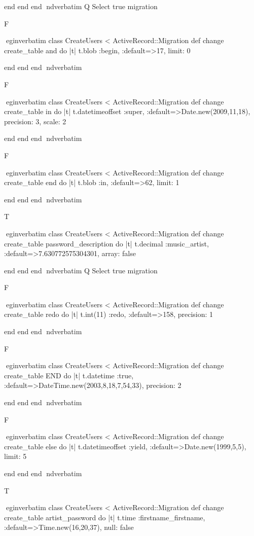     end 
  end 
end
nd{verbatim}
Q
 Select true migration

F

egin{verbatim}
 class CreateUsers < ActiveRecord::Migration 
  def change 
    create_table and do |t| 
      t.blob :begin, :default=>17, limit: 0
    
    end 
  end 
end
nd{verbatim}

F

egin{verbatim}
 class CreateUsers < ActiveRecord::Migration 
  def change 
    create_table in do |t| 
      t.datetimeoffset :super, :default=>Date.new(2009,11,18), precision: 3, scale: 2
    
    end 
  end 
end
nd{verbatim}

F

egin{verbatim}
 class CreateUsers < ActiveRecord::Migration 
  def change 
    create_table end do |t| 
      t.blob :in, :default=>62, limit: 1
    
    end 
  end 
end
nd{verbatim}

T

egin{verbatim}
 class CreateUsers < ActiveRecord::Migration 
  def change 
    create_table password_description do |t| 
      t.decimal :music_artist, :default=>7.630772575304301, array: false
    
    end 
  end 
end
nd{verbatim}
Q
 Select true migration

F

egin{verbatim}
 class CreateUsers < ActiveRecord::Migration 
  def change 
    create_table redo do |t| 
      t.int(11) :redo, :default=>158, precision: 1
    
    end 
  end 
end
nd{verbatim}

F

egin{verbatim}
 class CreateUsers < ActiveRecord::Migration 
  def change 
    create_table END do |t| 
      t.datetime :true, :default=>DateTime.new(2003,8,18,7,54,33), precision: 2
    
    end 
  end 
end
nd{verbatim}

F

egin{verbatim}
 class CreateUsers < ActiveRecord::Migration 
  def change 
    create_table else do |t| 
      t.datetimeoffset :yield, :default=>Date.new(1999,5,5), limit: 5
    
    end 
  end 
end
nd{verbatim}

T

egin{verbatim}
 class CreateUsers < ActiveRecord::Migration 
  def change 
    create_table artist_password do |t| 
      t.time :firstname_firstname, :default=>Time.new(16,20,37), null: false
    

